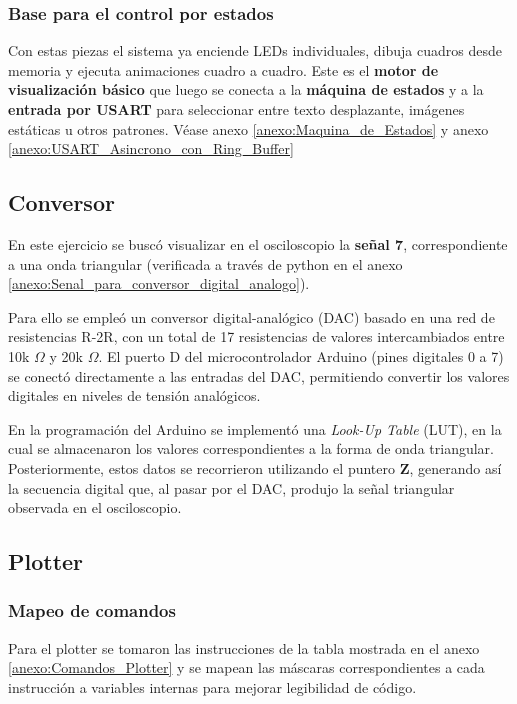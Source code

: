 \subsubsection{Base para el control por estados}
Con estas piezas el sistema ya enciende LEDs individuales, dibuja cuadros desde memoria y ejecuta animaciones cuadro a cuadro. Este es el \textbf{motor de visualización básico} que luego se conecta a la \textbf{máquina de estados} y a la \textbf{entrada por USART} para seleccionar entre texto desplazante, imágenes estáticas u otros patrones. Véase anexo \ref{anexo:Maquina_de_Estados} y anexo \ref{anexo:USART_Asincrono_con_Ring_Buffer}

\newpage

\subsection{Conversor}
En este ejercicio se buscó visualizar en el osciloscopio la \textbf{señal 7}, correspondiente a una onda triangular (verificada a través de python en el anexo \ref{anexo:Senal_para_conversor_digital_analogo}).

Para ello se empleó un conversor digital-analógico (DAC) basado en una red de resistencias R-2R, con un total de 17 resistencias de valores intercambiados entre 10k $\Omega$ y 20k $\Omega$. El puerto D del microcontrolador Arduino (pines digitales 0 a 7) se conectó directamente a las entradas del DAC, permitiendo convertir los valores digitales en niveles de tensión analógicos.

En la programación del Arduino se implementó una \textit{Look-Up Table} (LUT), en la cual se almacenaron los valores correspondientes a la forma de onda triangular. Posteriormente, estos datos se recorrieron utilizando el puntero \textbf{Z}, generando así la secuencia digital que, al pasar por el DAC, produjo la señal triangular observada en el osciloscopio.

\subsection{Plotter}

\subsubsection{Mapeo de comandos}
Para el plotter se tomaron las instrucciones de la tabla mostrada en el anexo \ref{anexo:Comandos_Plotter} y se mapean las máscaras correspondientes a cada instrucción a variables internas para mejorar legibilidad de código.

